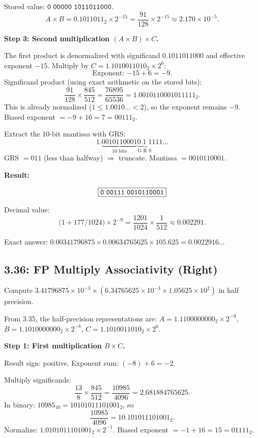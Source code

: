 Stored value: $\texttt{0\;00000\;1011011000}$.
\[
  A \times B = 0.1011011_2 \times 2^{-15}
  = \frac{91}{128} \times 2^{-15}
  \approx 2.170 \times 10^{-5}.
\]

\noindent\textbf{Step 3: Second multiplication $(A \times B) \times C$.}

The first product is denormalized with significand $0.1011011000$ and effective
exponent $-15$.  Multiply by $C = 1.1010011010_2 \times 2^{6}$:
\[
  \text{Exponent: } {-15} + 6 = -9.
\]
Significand product (using exact arithmetic on the stored bits):
\[
  \frac{91}{128} \times \frac{845}{512}
  = \frac{76895}{65536}
  = 1.0010110001011111_2.
\]
This is already normalized ($1 \le 1.0010\ldots < 2$), so the exponent remains
$-9$.  Biased exponent $= -9 + 16 = 7 = 00111_2$.

Extract the 10-bit mantissa with GRS:
\[
  1.\underbrace{0010110001}_{10\text{ bits}}\underbrace{0\;1\;1}_{\text{G R S}}111\ldots
\]
GRS $= 011$ (less than halfway) $\Rightarrow$ truncate.
Mantissa $= 0010110001$.

\medskip\noindent\textbf{Result:}

\[
  \boxed{\texttt{0\;00111\;0010110001}}
\]

Decimal value:
\[
  \bigl(1 + 177/1024\bigr) \times 2^{-9}
  = \frac{1201}{1024} \times \frac{1}{512}
  \approx \mathbf{0.002291} .
\]

Exact answer: $0.00341796875 \times 0.00634765625 \times 105.625
= 0.0022916\ldots$

\subsection*{3.36: FP Multiply Associativity (Right)}
\hypertarget{sol-3.36}{}

Compute $3.41796875 \times 10^{-3} \times (6.34765625 \times 10^{-3}
\times 1.05625 \times 10^{2})$ in half precision.

From 3.35, the half-precision representations are:
$A = 1.1100000000_2 \times 2^{-9}$,\;
$B = 1.1010000000_2 \times 2^{-8}$,\;
$C = 1.1010011010_2 \times 2^{6}$.

\medskip\noindent\textbf{Step 1: First multiplication $B \times C$.}

Result sign: positive.  Exponent sum: $(-8) + 6 = -2$.

Multiply significands:
\[
  \frac{13}{8} \times \frac{845}{512}
  = \frac{10985}{4096}
  = 2.681884765625.
\]
In binary: $10985_{10} = 10101011101001_2$, so
\[
  \frac{10985}{4096} = 10.101011101001_2.
\]
Normalize: $1.0101011101001_2 \times 2^{-1}$.
Biased exponent $= -1 + 16 = 15 = 01111_2$.

